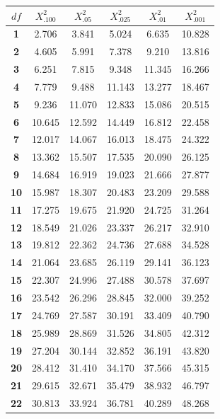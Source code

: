 \begin{center}
\small
\begin{tabular}{c|c|c|c|c|c}
\hline
\multicolumn{1}{c}{$df$} & \multicolumn{1}{c}{$X^2_{.100}$} & \multicolumn{1}{c}{$X^2_{.05}$}  & \multicolumn{1}{c}{$X^2_{.025}$}  & \multicolumn{1}{c}{$X^2_{.01}$}   & \multicolumn{1}{c}{$X^2_{.001}$}   \tstrut\bstrut\\
\hline
\textbf{1}  & 2.706  & 3.841  & 5.024  & 6.635  & 10.828 \tstrut\\
\textbf{2}  & 4.605  & 5.991  & 7.378  & 9.210  & 13.816 \\
\textbf{3}  & 6.251  & 7.815  & 9.348  & 11.345 & 16.266 \\
\textbf{4}  & 7.779  & 9.488  & 11.143 & 13.277 & 18.467 \\
\textbf{5}  & 9.236  & 11.070 & 12.833 & 15.086 & 20.515 \\
\textbf{6}  & 10.645 & 12.592 & 14.449 & 16.812 & 22.458 \\
\textbf{7}  & 12.017 & 14.067 & 16.013 & 18.475 & 24.322 \\
\textbf{8 } & 13.362 & 15.507 & 17.535 & 20.090 & 26.125 \\
\textbf{9}  & 14.684 & 16.919 & 19.023 & 21.666 & 27.877 \\
\textbf{10} & 15.987 & 18.307 & 20.483 & 23.209 & 29.588 \\
\textbf{11} & 17.275 & 19.675 & 21.920 & 24.725 & 31.264 \\
\textbf{12} & 18.549 & 21.026 & 23.337 & 26.217 & 32.910 \\
\textbf{13} & 19.812 & 22.362 & 24.736 & 27.688 & 34.528 \\
\textbf{14} & 21.064 & 23.685 & 26.119 & 29.141 & 36.123 \\
\textbf{15} & 22.307 & 24.996 & 27.488 & 30.578 & 37.697 \\
\textbf{16 }& 23.542 & 26.296 & 28.845 & 32.000 & 39.252 \\
\textbf{17} & 24.769 & 27.587 & 30.191 & 33.409 & 40.790 \\
\textbf{18} & 25.989 & 28.869 & 31.526 & 34.805 & 42.312 \\
\textbf{19} & 27.204 & 30.144 & 32.852 & 36.191 & 43.820 \\
\textbf{20} & 28.412 & 31.410 & 34.170 & 37.566 & 45.315 \\
\textbf{21} & 29.615 & 32.671 & 35.479 & 38.932 & 46.797 \\
\textbf{22} & 30.813 & 33.924 & 36.781 & 40.289 & 48.268 \\

\end{tabular}
\end{center}
